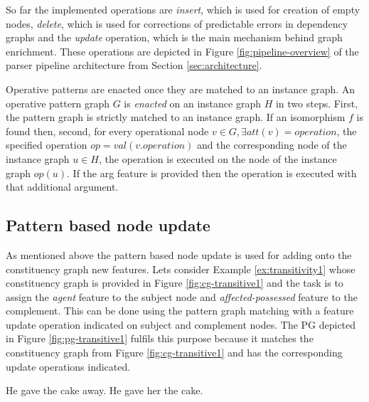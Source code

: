     So far the implemented operations are \textit{insert}, which is used for creation of empty nodes, \textit{delete}, which is used for corrections of predictable errors in dependency graphs and the \textit{update} operation, which is the main mechanism behind graph enrichment. These operations are depicted in Figure \ref{fig:pipeline-overview} of the parser pipeline architecture from Section \ref{sec:architecture}.

    Operative patterns are enacted once they are matched to an instance graph. An operative pattern graph $G$ is \textit{enacted} on an instance graph $H$ in two steps. First, the pattern graph is strictly matched to an instance graph. If an isomorphism $f$ is found then, second, for every operational node $v \in G, \exists att(v)=operation$, the specified operation $op = val(v.operation)$ and the corresponding node of the instance graph $u \in H$, the operation is executed on the node of the instance graph $op(u)$. If the arg feature is provided then the operation is executed with that additional argument. 

\subsection{Pattern based node update} 

    As mentioned above the pattern based node update is used for adding onto the constituency graph new features. Lets consider Example \ref{ex:transitivity1} whose constituency graph is provided in Figure \ref{fig:cg-transitive1} and the task is to assign the \textit{agent} feature to the subject node and \textit{affected-possessed} feature to the complement. This can be done using the pattern graph matching with a feature update operation indicated on subject and complement nodes. The PG depicted in Figure \ref{fig:pg-transitive1} fulfils this purpose because it matches the constituency graph from Figure \ref{fig:cg-transitive1} and has the corresponding update operations indicated.

    \begin{exe}
        \ex\label{ex:transitivity1} He gave the cake away.
        \ex\label{ex:transitivity2} He gave her the cake.
    \end{exe}

    
